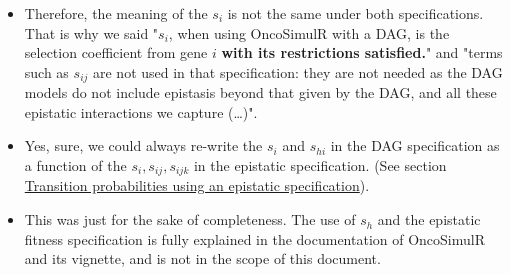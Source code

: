 \documentclass[11pt]{article}
\begin{document}
\begin{itemize}
\item Therefore, the meaning of the \(s_i\) is not the same under both specifications. That is why we said "\(s_i\), when using OncoSimulR with a DAG, is the selection coefficient from gene \(i\) \textbf{with its restrictions satisfied.}" and "terms such as \(s_{ij}\) are not used in that specification: they are not needed as the DAG models do not include epistasis beyond that given by the DAG, and all these epistatic interactions we capture (\ldots{})".

\item Yes, sure, we could always re-write the \(s_{i}\) and \(s_{hi}\) in the DAG specification as a function of the \(s_i, s_{ij}, s_{ijk}\) in the epistatic specification. (See section \hyperref[sec:orge68f649]{Transition probabilities using an epistatic specification}).

\item This was just for the sake of completeness. The use of \(s_h\) and the epistatic fitness specification is fully explained in the documentation of OncoSimulR and its vignette, and is not in the scope of this document.
\end{itemize}
\end{document}
